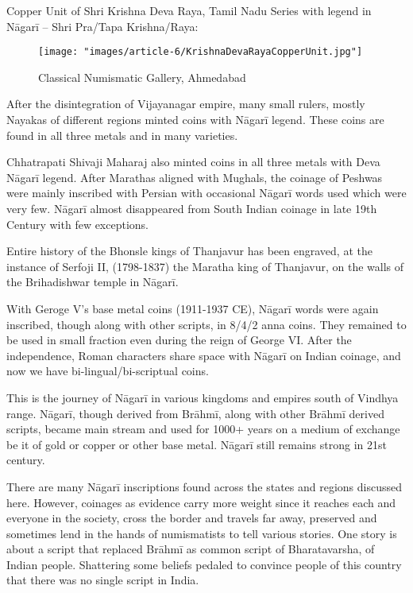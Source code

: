 Copper Unit of Shri Krishna Deva Raya, Tamil Nadu Series with legend in Nāgarī – Shri Pra/Tapa Krishna/Raya:

\begin{figure}
\texttt{[image: "images/article-6/KrishnaDevaRayaCopperUnit.jpg"]}
\caption{Classical Numismatic Gallery, Ahmedabad}
\end{figure}

After the disintegration of Vijayanagar empire, many small rulers, mostly Nayakas of different regions minted coins with Nāgarī legend. These coins are found in all three metals and in many varieties.

Chhatrapati Shivaji Maharaj also minted coins in all three metals with Deva Nāgarī legend. After Marathas aligned with Mughals, the coinage of Peshwas were mainly inscribed with Persian with occasional Nāgarī words used which were very few. Nāgarī almost disappeared from South Indian coinage in late 19th Century with few exceptions.

Entire history of the Bhonsle kings of Thanjavur has been engraved, at the instance of Serfoji II, (1798-1837) the Maratha king of Thanjavur, on the walls of the Brihadishwar temple in Nāgarī.

With Geroge V’s base metal coins (1911-1937 CE), Nāgarī words were again inscribed, though along with other scripts, in 8/4/2 anna coins. They remained to be used in small fraction even during the reign of George VI. After the independence, Roman characters share space with Nāgarī on Indian coinage, and now we have bi-lingual/bi-scriptual coins.

This is the journey of Nāgarī in various kingdoms and empires south of Vindhya range. Nāgarī, though derived from Brāhmī, along with other Brāhmī derived scripts, became main stream and used for 1000+ years on a medium of exchange be it of gold or copper or other base metal. Nāgarī still remains strong in 21st century.

There are many Nāgarī inscriptions found across the states and regions discussed here. However, coinages as evidence carry more weight since it reaches each and everyone in the society, cross the border and travels far away, preserved and sometimes lend in the hands of numismatists to tell various stories. One story is about a script that replaced Brāhmī as common script of Bharatavarsha, of Indian people. Shattering some beliefs pedaled to convince people of this country that there was no single script in India.

